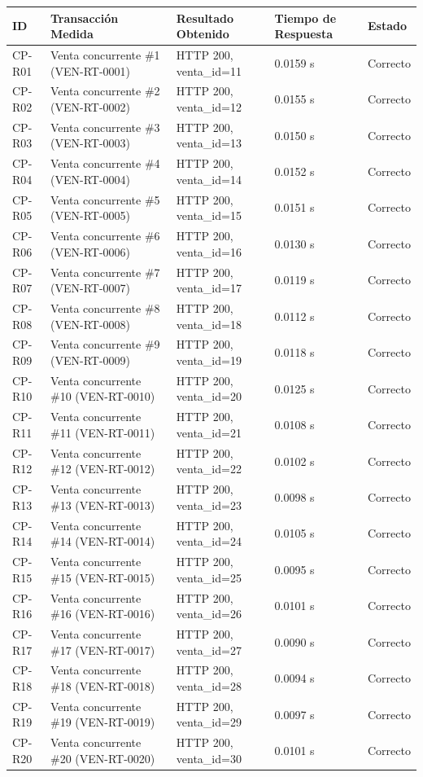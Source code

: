 \documentclass{article}
\begin{document}
\begin{longtable}{|p{}|p{}|p{}|p{}|p{}|}
\hline
\textbf{ID} & \textbf{Transacción Medida} & \textbf{Resultado Obtenido} & \textbf{Tiempo de Respuesta} & \textbf{Estado}\\
\hline
\endhead
CP-R01 & Venta concurrente \#1 (VEN-RT-0001) & HTTP 200, venta\_id=11 & 0.0159 s & Correcto\\ \hline
CP-R02 & Venta concurrente \#2 (VEN-RT-0002) & HTTP 200, venta\_id=12 & 0.0155 s & Correcto\\ \hline
CP-R03 & Venta concurrente \#3 (VEN-RT-0003) & HTTP 200, venta\_id=13 & 0.0150 s & Correcto\\ \hline
CP-R04 & Venta concurrente \#4 (VEN-RT-0004) & HTTP 200, venta\_id=14 & 0.0152 s & Correcto\\ \hline
CP-R05 & Venta concurrente \#5 (VEN-RT-0005) & HTTP 200, venta\_id=15 & 0.0151 s & Correcto\\ \hline
CP-R06 & Venta concurrente \#6 (VEN-RT-0006) & HTTP 200, venta\_id=16 & 0.0130 s & Correcto\\ \hline
CP-R07 & Venta concurrente \#7 (VEN-RT-0007) & HTTP 200, venta\_id=17 & 0.0119 s & Correcto\\ \hline
CP-R08 & Venta concurrente \#8 (VEN-RT-0008) & HTTP 200, venta\_id=18 & 0.0112 s & Correcto\\ \hline
CP-R09 & Venta concurrente \#9 (VEN-RT-0009) & HTTP 200, venta\_id=19 & 0.0118 s & Correcto\\ \hline
CP-R10 & Venta concurrente \#10 (VEN-RT-0010) & HTTP 200, venta\_id=20 & 0.0125 s & Correcto\\ \hline
CP-R11 & Venta concurrente \#11 (VEN-RT-0011) & HTTP 200, venta\_id=21 & 0.0108 s & Correcto\\ \hline
CP-R12 & Venta concurrente \#12 (VEN-RT-0012) & HTTP 200, venta\_id=22 & 0.0102 s & Correcto\\ \hline
CP-R13 & Venta concurrente \#13 (VEN-RT-0013) & HTTP 200, venta\_id=23 & 0.0098 s & Correcto\\ \hline
CP-R14 & Venta concurrente \#14 (VEN-RT-0014) & HTTP 200, venta\_id=24 & 0.0105 s & Correcto\\ \hline
CP-R15 & Venta concurrente \#15 (VEN-RT-0015) & HTTP 200, venta\_id=25 & 0.0095 s & Correcto\\ \hline
CP-R16 & Venta concurrente \#16 (VEN-RT-0016) & HTTP 200, venta\_id=26 & 0.0101 s & Correcto\\ \hline
CP-R17 & Venta concurrente \#17 (VEN-RT-0017) & HTTP 200, venta\_id=27 & 0.0090 s & Correcto\\ \hline
CP-R18 & Venta concurrente \#18 (VEN-RT-0018) & HTTP 200, venta\_id=28 & 0.0094 s & Correcto\\ \hline
CP-R19 & Venta concurrente \#19 (VEN-RT-0019) & HTTP 200, venta\_id=29 & 0.0097 s & Correcto\\ \hline
CP-R20 & Venta concurrente \#20 (VEN-RT-0020) & HTTP 200, venta\_id=30 & 0.0101 s & Correcto\\ \hline
\end{longtable}
\end{document}
